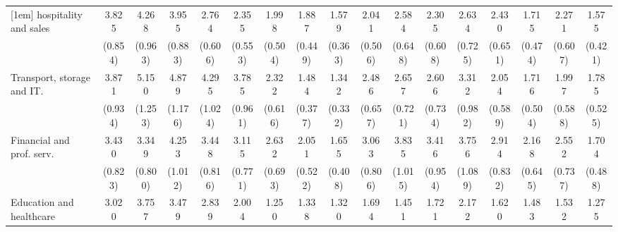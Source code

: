 {\begin{tabular}{l*{16}{c}}
[1em]
hospitality and sales&       3.825\sym{***}&       4.268\sym{***}&       3.955\sym{***}&       2.764\sym{***}&       2.355\sym{***}&       1.998\sym{**} &       1.887\sym{**} &       1.579\sym{*}  &       2.041\sym{**} &       2.584\sym{***}&       2.305\sym{**} &       2.634\sym{***}&       2.430\sym{***}&       1.715         &       2.271\sym{**} &       1.575         \\
                    &     (0.854)         &     (0.963)         &     (0.883)         &     (0.606)         &     (0.553)         &     (0.504)         &     (0.449)         &     (0.363)         &     (0.506)         &     (0.648)         &     (0.608)         &     (0.725)         &     (0.651)         &     (0.474)         &     (0.607)         &     (0.421)         \\
[1em]
Transport, storage and IT.&       3.871\sym{***}&       5.150\sym{***}&       4.879\sym{***}&       4.295\sym{***}&       3.785\sym{***}&       2.322\sym{**} &       1.484         &       1.342         &       2.486\sym{***}&       2.657\sym{***}&       2.606\sym{***}&       3.312\sym{***}&       2.054\sym{*}  &       1.716         &       1.997\sym{*}  &       1.785\sym{*}  \\
                    &     (0.934)         &     (1.253)         &     (1.176)         &     (1.024)         &     (0.961)         &     (0.616)         &     (0.377)         &     (0.332)         &     (0.657)         &     (0.721)         &     (0.734)         &     (0.982)         &     (0.589)         &     (0.504)         &     (0.588)         &     (0.525)         \\
[1em]
Financial and prof. serv.&       3.430\sym{***}&       3.349\sym{***}&       4.253\sym{***}&       3.448\sym{***}&       3.115\sym{***}&       2.632\sym{***}&       2.051\sym{**} &       1.655\sym{*}  &       3.063\sym{***}&       3.835\sym{***}&       3.416\sym{***}&       3.756\sym{***}&       2.914\sym{***}&       2.168\sym{**} &       2.552\sym{**} &       1.704         \\
                    &     (0.823)         &     (0.800)         &     (1.012)         &     (0.816)         &     (0.771)         &     (0.693)         &     (0.522)         &     (0.408)         &     (0.806)         &     (1.015)         &     (0.954)         &     (1.089)         &     (0.832)         &     (0.645)         &     (0.737)         &     (0.488)         \\
[1em]
Education and healthcare&       3.020\sym{***}&       3.757\sym{***}&       3.479\sym{***}&       2.839\sym{***}&       2.004\sym{*}  &       1.250         &       1.338         &       1.320         &       1.694         &       1.451         &       1.721         &       2.172\sym{*}  &       1.620         &       1.483         &       1.532         &       1.275         \\

\end{tabular}}
